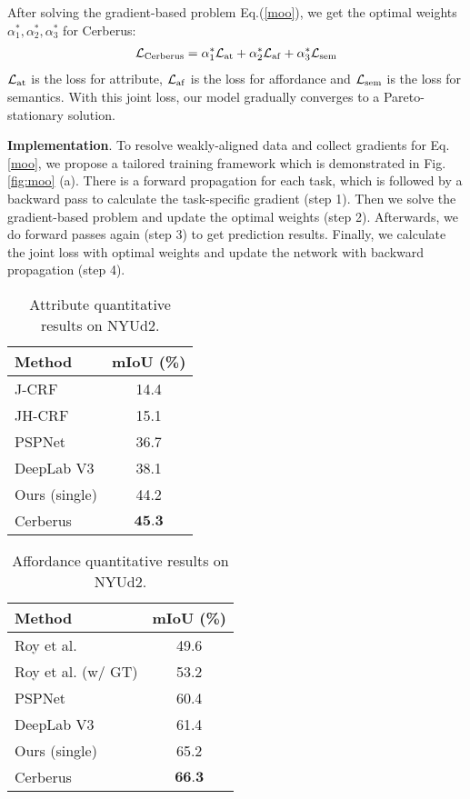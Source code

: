 \documentclass[10pt,twocolumn,letterpaper]{article}
\begin{document}
After solving the gradient-based problem Eq.(\ref{moo}), we get the optimal weights $\alpha_1^*,\alpha_2^*,\alpha_3^*$  for Cerberus:
\begin{align}
\mathcal{L}_{\rm Cerberus} = \alpha_1^* \mathcal{L}_{\rm at}+\alpha_2^* \mathcal{L}_{\rm af} + \alpha_3^* \mathcal{L}_{\rm sem} 
\end{align}
 $\mathcal{L}_{\rm at}$ is the loss for attribute, $\mathcal{L}_{\rm af}$ is the loss for affordance and $\mathcal{L}_{\rm sem}$ is the loss for semantics. With this joint loss, our model gradually converges to a Pareto-stationary solution. 

\textbf{Implementation}. To resolve weakly-aligned data and collect gradients for Eq.\ref{moo}, we propose a tailored training framework which  is demonstrated in Fig.\ref{fig:moo} (a). There is a forward propagation for each task, which is followed by a backward pass to calculate the task-specific gradient (step 1). Then we solve the gradient-based problem and update the optimal weights (step 2). Afterwards, we do forward passes again (step 3) to get prediction results. Finally, we calculate the joint loss with optimal weights and update the network with backward propagation (step 4). 

\begin{table}
	\centering
	\begin{tabular}{@{}lc@{}}
		\toprule
		\textbf{Method} & \textbf{mIoU (\%)} \\
		\midrule
		J-CRF \cite{zheng2014dense} & 14.4 \\
		JH-CRF \cite{zheng2014dense} & 15.1 \\
		PSPNet \cite{zhao2017pyramid} & 36.7  \\
		DeepLab V3 \cite{chen2017rethinking} &  38.1 \\
		\midrule
		Ours (single) & {44.2} \\
		Cerberus & $\textbf{45.3}$ \\
		\bottomrule
	\end{tabular}
	\caption{Attribute quantitative results on NYUd2.}
	\label{tab:attribute}
\end{table}

\begin{table}
	\centering
	\begin{tabular}{@{}lc@{}}
		\toprule
		\textbf{Method} & \textbf{mIoU (\%)} \\
		\midrule
		Roy et al. \cite{roy2016multi} & 49.6 \\
		Roy et al.  (w/ GT) \cite{roy2016multi} & 53.2 \\
		PSPNet \cite{zhao2017pyramid} & 60.4  \\
		DeepLab V3 \cite{chen2017rethinking} & 61.4  \\
		\midrule
		Ours (single) & {65.2} \\
		Cerberus & $\textbf{66.3}$ \\
		\bottomrule
	\end{tabular}
	\caption{Affordance quantitative results on NYUd2.}
	\label{tab:affordance}
\end{table}
\end{document}
